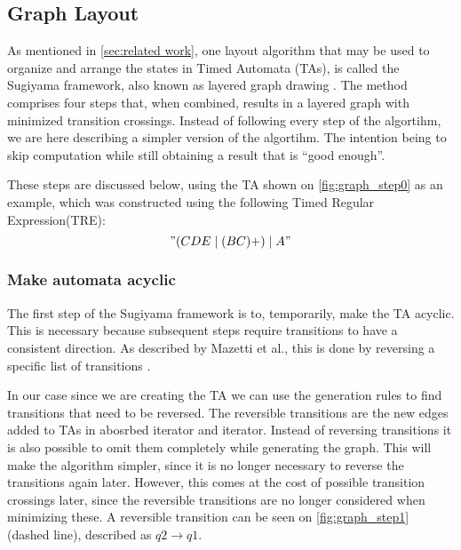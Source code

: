 \subsection{Graph Layout}\label{subsec:graphlayout}





As mentioned in \cref{sec:related work}, one layout algorithm that may be used to organize and arrange the states in Timed Automata (TAs), is called the Sugiyama framework, also known as layered graph drawing \cite{Sugiyama1981}. The method comprises four steps that, when combined, results in a layered graph with minimized transition crossings. Instead of following every step of the algortihm, we are here describing a simpler version of the algortihm. The intention being to skip computation while still obtaining a result that is ``good enough''.

These steps are discussed below, using the TA shown on \cref{fig:graph_step0} as an example, which was constructed using the following Timed Regular Expression(TRE): $$"(CDE\mid(BC)+)\mid A"$$

\begin{center}
    
\end{center}

\subsubsection{Make automata acyclic}
The first step of the Sugiyama framework is to, temporarily, make the TA acyclic. This is necessary because subsequent steps require transitions to have a consistent direction. As described by Mazetti et al., this is done by reversing a specific list of transitions \cite{Mazetti2012}.

In our case since we are creating the TA we can use the generation rules to find transitions that need to be reversed.
The reversible transitions are the new edges added to TAs in abosrbed iterator and iterator.
Instead of reversing transitions it is also possible to omit them completely while generating the graph. This will make the algorithm simpler, since it is no longer necessary to reverse the transitions again later. However, this comes at the cost of possible transition crossings later, since the reversible transitions are no longer considered when minimizing these. A reversible transition can be seen on \cref{fig:graph_step1} (dashed line), described as $q2\rightarrow q1$.

